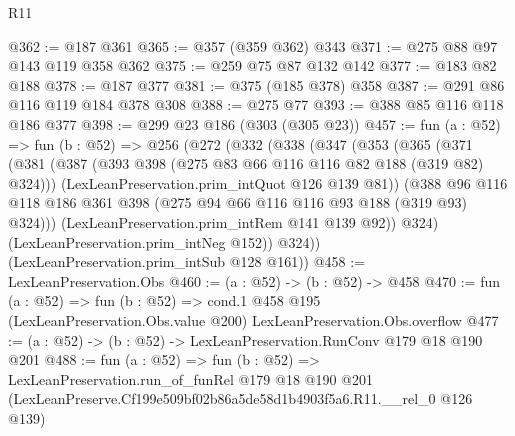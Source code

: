 \begin{lexlean}{R11}
\begin{coremodule}
@362 := @187 @361
@365 := @357 (@359 @362) @343
@371 := @275 @88 @97 @143 @119 @358 @362
@375 := @259 @75 @87 @132 @142
@377 := @183 @82 @188
@378 := @187 @377
@381 := @375 (@185 @378) @358
@387 := @291 @86 @116 @119 @184 @378 @308
@388 := @275 @77
@393 := @388 @85 @116 @118 @186 @377
@398 := @299 @23 @186 (@303 (@305 @23))
@457 := fun (a : @52) =>
  fun (b : @52) =>
  @256
    (@272
      (@332
        (@338
          (@347
            (@353
              (@365
                (@371
                  (@381
                    (@387 (@393 @398 (@275 @83 @66 @116 @116 @82 @188 (@319 @82) @324)))
                    (LexLeanPreservation.prim_intQuot @126 @139 @81))
                  (@388
                    @96
                    @116
                    @118
                    @186
                    @361
                    @398
                    (@275 @94 @66 @116 @116 @93 @188 (@319 @93) @324)))
                (LexLeanPreservation.prim_intRem @141 @139 @92))
              @324)
            (LexLeanPreservation.prim_intNeg @152))
          @324))
      (LexLeanPreservation.prim_intSub @128 @161))
@458 := LexLeanPreservation.Obs
@460 := (a : @52) -> (b : @52) -> @458
@470 := fun (a : @52) =>
  fun (b : @52) =>
  cond.{1} @458 @195 (LexLeanPreservation.Obs.value @200) LexLeanPreservation.Obs.overflow
@477 := (a : @52) -> (b : @52) -> LexLeanPreservation.RunConv @179 @18 @190 @201
@488 := fun (a : @52) =>
  fun (b : @52) =>
  LexLeanPreservation.run_of_funRel
    @179
    @18
    @190
    @201
    (LexLeanPreserve.Cf199e509bf02b86a5de58d1b4903f5a6.R11.__rel_0 @126 @139)
\end{coremodule}
\end{lexlean}
